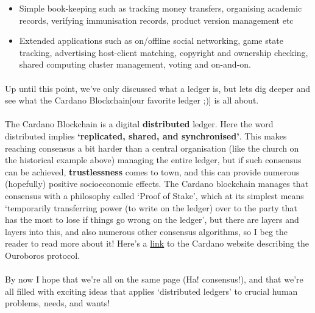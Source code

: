 \documentclass[a4paper, 11pt]{article}
\begin{document}
\begin{description}
        \begin{itemize}
            \item Simple book-keeping such as tracking money transfers, organising academic records, verifying immunisation records, product version management etc 
            \item Extended applications such as on/offline social networking, game state tracking, advertising host-client matching, copyright and ownership checking, shared computing cluster management, voting and on-and-on.
        \end{itemize}

        \paragraph{}Up until this point, we've only discussed what a ledger is, but lets dig deeper and see what the Cardano Blockchain[our favorite ledger ;)] is all about. 

        \paragraph{}The Cardano Blockchain is a digital \textbf{distributed} ledger. Here the word distributed implies \textbf{`replicated, shared, and synchronised'}. This makes reaching consensus a bit harder than a central organisation (like the church on the historical example above) managing the entire ledger, but if such consensus can be achieved, \textbf{trustlessness} comes to town, and this can provide numerous (hopefully) positive socioeconomic effects. The Cardano blockchain manages that consensus with a philosophy called `Proof of Stake', which at its simplest means `temporarily transferring power (to write on the ledger) over to the party that has the most to lose if things go wrong on the ledger', but there are layers and layers into this, and also numerous other consensus algorithms, so I beg the reader to read more about it! Here's a \href{https://cardano.org/ouroboros/}{link} to the Cardano website describing the Ouroboros protocol.

        \paragraph{}By now I hope that we're all on the same page (Ha! consensus!), and that we're all filled with exciting ideas that applies `distributed ledgers' to crucial human problems, needs, and wants! 
        


\end{description}
\end{document}
